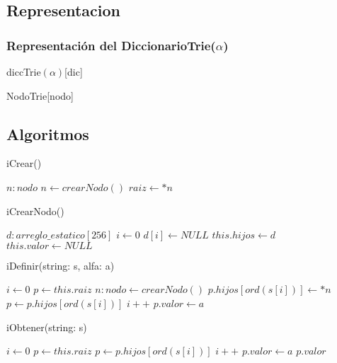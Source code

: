\subsection{Representacion}
  
  \subsubsection{Representaci\'on del DiccionarioTrie($\alpha$)}
  \begin{Estructura}{diccTrie$(\alpha)$}[dic]
    \begin{Tupla}[dic]
    \end{Tupla}
\end{Estructura}

  \begin{Estructura}{NodoTrie}[nodo]
    \begin{Tupla}[nodo]
    \end{Tupla}
\end{Estructura}


\subsection{Algoritmos}


\begin{algorithm}
\caption{iCrear()}
\begin{algorithmic}
\State $n : nodo$
\State $n \gets crearNodo()$
\State $raiz \gets *n$
\end{algorithmic}
\end{algorithm}


\begin{algorithm}
\caption{iCrearNodo()}
\begin{algorithmic}
\State $d : arreglo\_estatico[256]$
\State $i \gets 0$
\State $d[i] \gets NULL$
\EndWhile
\State $this.hijos \gets d$
\State $this.valor \gets NULL$
\end{algorithmic}
\end{algorithm}

\begin{algorithm}
\caption{iDefinir(string: s, alfa: a)}
\begin{algorithmic}
\State $i \gets 0$
\State $p \gets this.raiz$
\State $n: nodo \gets crearNodo()$
\State $p.hijos[ord(s[i])] \gets *n$
\EndIf
\State $p \gets p.hijos[ord(s[i])]$
\State $i++$
\EndWhile
\State $p.valor \gets a$
\end{algorithmic}
\end{algorithm}

\begin{algorithm}
\caption{iObtener(string: s)}
\begin{algorithmic}
\State $i \gets 0$
\State $p \gets this.raiz$
\State $p \gets p.hijos[ord(s[i])]$
\State $i++$
\EndWhile
\State $p.valor \gets a$
\Return $p.valor$
\end{algorithmic}
\end{algorithm}